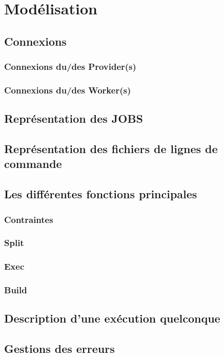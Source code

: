 \documentclass[11pt]{report}
\begin{document}
\newpage
\chapter{Modélisation}
\section{Connexions} 
\subsection{Connexions du/des Provider(s)} 
\subsection{Connexions du/des Worker(s)} 
\newpage
\section{Représentation des JOBS} 
\newpage
\section{Représentation des fichiers de lignes de commande} 
\newpage
\section{Les différentes fonctions principales}

\subsection{Contraintes} 
\subsection{Split} 
\subsection{Exec} 
\subsection{Build} 
\newpage
\section{Description d'une exécution quelconque} 
\newpage
\section{Gestions des erreurs}
\end{document}
